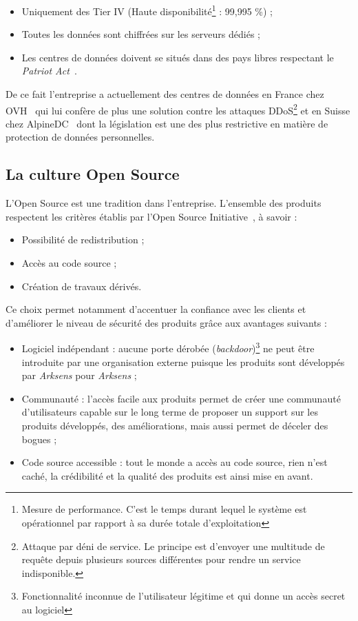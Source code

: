 \documentclass[a4paper,10pt, twoside]{report}
\begin{document}
\begin{spacing}{1.2}
\begin{itemize}
  \item Uniquement des Tier IV (Haute disponibilité\footnote{Mesure de
  performance. C'est le temps durant lequel le système est opérationnel par
  rapport à sa durée totale d'exploitation} : 99,995 \%) ;
  \item Toutes les données sont chiffrées sur les serveurs dédiés ;
  \item Les centres de données doivent se situés dans des pays libres
  respectant le \textit{Patriot Act}~\cite{refPatriotAct}.
\end{itemize}

De ce fait l'entreprise a actuellement des centres de données en France
chez OVH~\cite{refOVH} qui lui confère de plus une solution contre les
attaques DDoS\footnote{Attaque par déni de service. Le principe est d'envoyer
une multitude de requête depuis plusieurs sources différentes pour rendre
un service indisponible.} et en Suisse chez AlpineDC~\cite{refAlpineDC} dont la
législation est une des plus restrictive en matière de protection de
données personnelles.

\subsection{La culture Open Source}

L'Open Source est une tradition dans l'entreprise. L'ensemble des
produits respectent les critères établis par l'Open Source
Initiative~\cite{refOSI}, à savoir :

\begin{itemize}
  \item Possibilité de redistribution ;
  \item Accès au code source ;
  \item Création de travaux dérivés.
\end{itemize}

Ce choix permet notamment d'accentuer la confiance avec les clients et
d'améliorer le niveau de sécurité des produits grâce aux avantages
suivants :

\begin{itemize}
  \item Logiciel indépendant : aucune porte dérobée
  (\textit{backdoor})\footnote{Fonctionnalité inconnue de l'utilisateur
  légitime et qui donne un accès secret au logiciel} ne peut
  être introduite par une organisation externe puisque les produits sont
  développés par \textit{Arksens} pour \textit{Arksens} ;
  \item Communauté : l'accès facile aux produits permet de créer une
  communauté d'utilisateurs capable sur le long terme de proposer un
  support sur les produits développés, des améliorations, mais aussi
  permet de déceler des bogues ;
  \item Code source accessible : tout le monde a accès au code source,
  rien n'est caché, la crédibilité et la qualité des produits est ainsi
  mise en avant.
\end{itemize}


\end{spacing}
\end{document}
